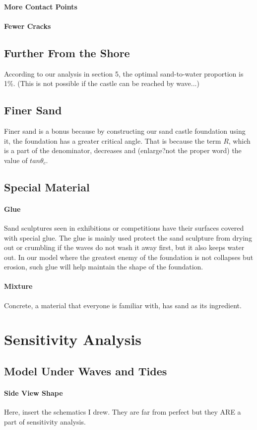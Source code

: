 \documentclass[12pt]{article}
\begin{document}
\paragraph{More Contact Points}
\paragraph{Fewer Cracks}
\subsection{Further From the Shore}
According to our analysis in section 5, the optimal sand-to-water proportion is 1\%. 
(This is not possible if the castle can be reached by wave...)
\subsection{Finer Sand}
Finer sand is a bonus because by constructing our sand castle foundation using it, the foundation has a greater critical angle. That is because the term $R$, which is a part of the denominator, decreases and (enlarge?not the proper word) the value of $tan\theta_c$. 
\subsection{Special Material}
\paragraph{Glue}
Sand sculptures seen in exhibitions or competitions have their surfaces covered with special glue. The glue is mainly used protect the sand sculpture from drying out or crumbling if the waves do not wash it away first, but it also keeps water out. In our model where the greatest enemy of the foundation is not collapses but erosion, such glue will help maintain the shape of the foundation. 
\paragraph{Mixture}
Concrete, a material that everyone is familiar with, has sand as its ingredient. 
\section{Sensitivity Analysis}
\subsection{Model Under Waves and Tides}
\paragraph{Side View Shape}
Here, insert the schematics I drew. They are far from perfect but they ARE a part of sensitivity analysis.
\end{document}
